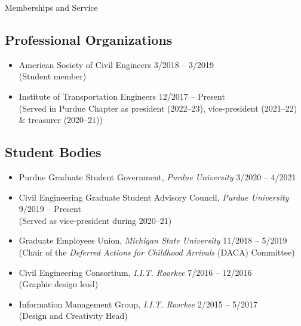 \documentclass{CV} %
\begin{document}
\begin{rSection}{Memberships and Service}
    \subsection*{Professional Organizations}
    \begin{itemize}
        \item American Society of Civil Engineers \hfill 3/2018 – 3/2019
        \\ (Student member)
        \item Institute of Transportation Engineers \hfill 12/2017 – Present \\
        (Served in Purdue Chapter as president (2022–23), vice-president (2021–22) \& treasurer (2020–21))
    \end{itemize}
    \subsection*{Student Bodies}
    \begin{itemize}
        \item Purdue Graduate Student Government, \textit{Purdue University} \hfill 3/2020 – 4/2021
        \item Civil Engineering Graduate Student Advisory Council, \textit{Purdue University} \hfill 9/2019 – Present \\
        (Served as vice-president during 2020–21)
        \item Graduate Employees Union, \textit{Michigan State University} \hfill 11/2018 – 5/2019 \\
        (Chair of the \emph{Deferred Actions for Childhood Arrivals} (DACA) Committee)
        \item Civil Engineering Consortium, \textit{I.I.T. Roorkee} \hfill 7/2016 – 12/2016
        \\ (Graphic design lead)
        \item Information Management Group, \textit{I.I.T. Roorkee} \hfill 2/2015 – 5/2017
        \\ (Design and Creativity Head)
    \end{itemize}

\end{rSection}
\end{document}
